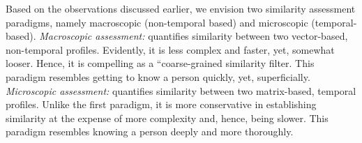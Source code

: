 \documentclass{elsarticle}
\begin{document}
Based on the observations discussed earlier, we envision two similarity
assessment paradigms, namely macroscopic (non-temporal based) and
microscopic (temporal-based). \textit{Macroscopic assessment:} quantifies
similarity between two vector-based, non-temporal profiles. Evidently,
it is less complex and faster, yet, somewhat looser. Hence, it is
compelling as a ``coarse-grained\textquotedbl{} similarity filter.
This paradigm resembles getting to know a person quickly, yet, superficially.
\textit{Microscopic assessment:} quantifies similarity between two
matrix-based, temporal profiles. Unlike the first paradigm, it is
more conservative in establishing similarity at the expense of more
complexity and, hence, being slower. This paradigm resembles knowing
a person deeply and more thoroughly.

{} 
\end{document}
